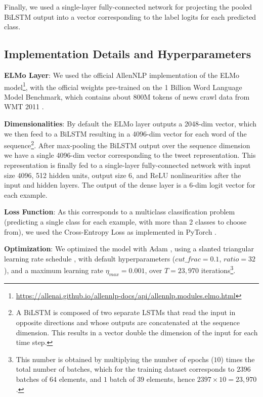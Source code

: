 \documentclass[11pt,a4paper]{article}
\begin{document}
Finally, we used a single-layer fully-connected network for projecting the pooled BiLSTM output into a vector corresponding to the label logits for each predicted class.

\subsection{Implementation Details and Hyperparameters}

\hspace{\parindent} \textbf{ELMo Layer}: We used the official AllenNLP implementation of the ELMo model\footnote{\tiny\url{https://allenai.github.io/allennlp-docs/api/allennlp.modules.elmo.html}}, with the official weights pre-trained on the 1 Billion Word Language Model Benchmark, which contains about 800M tokens of news crawl data from WMT 2011 \cite{Chelba2014}.

\textbf{Dimensionalities}: By default the ELMo layer outputs a 2048-dim vector, which we then feed to a BiLSTM resulting in a 4096-dim vector for each word of the sequence\footnote{A BiLSTM is composed of two separate LSTMs that read the input in opposite directions and whose outputs are concatenated at the sequence dimension. This results in a vector double the dimension of the input for each time step.}. After max-pooling the BiLSTM output over the sequence dimension we have a single 4096-dim vector corresponding to the tweet representation. This representation is finally fed to a single-layer fully-connected network with input size 4096, 512 hidden units, output size 6, and ReLU nonlinearities after the input and hidden layers. The output of the dense layer is a 6-dim logit vector for each example.

\textbf{Loss Function}: As this corresponds to a multiclass classification problem (predicting a single class for each example, with more than 2 classes to choose from), we used the Cross-Entropy Loss as implemented in PyTorch \cite{paszke2017automatic}.

\textbf{Optimization}: We optimized the model with Adam \cite{DBLP:journals/corr/KingmaB14}, using a slanted triangular learning rate schedule \cite{howard2018universal}, with default hyperparameters ($cut\_frac=0.1$, $ratio=32$), and a maximum learning rate $\eta_{max}=0.001$, over $T=23,970$ iterations\footnote{This number is obtained by multiplying the number of epochs ($10$) times the total number of batches, which for the training dataset corresponds to $2396$ batches of $64$ elements, and $1$ batch of $39$ elements, hence $2397\times10=23,970$.}.
\end{document}
